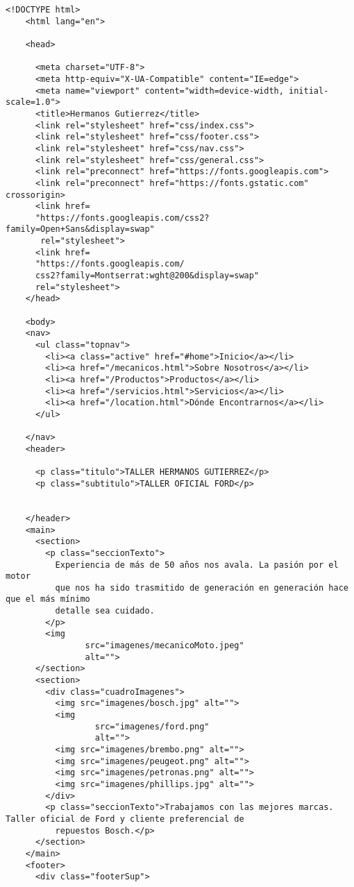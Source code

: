 \begin{lstlisting}[caption=index.html (LMSI)]
    <!DOCTYPE html>
    <html lang="en">
    
    <head>
    
      <meta charset="UTF-8">
      <meta http-equiv="X-UA-Compatible" content="IE=edge">
      <meta name="viewport" content="width=device-width, initial-scale=1.0">
      <title>Hermanos Gutierrez</title>
      <link rel="stylesheet" href="css/index.css">
      <link rel="stylesheet" href="css/footer.css">
      <link rel="stylesheet" href="css/nav.css">
      <link rel="stylesheet" href="css/general.css">
      <link rel="preconnect" href="https://fonts.googleapis.com">
      <link rel="preconnect" href="https://fonts.gstatic.com" crossorigin>
      <link href=
      "https://fonts.googleapis.com/css2?family=Open+Sans&display=swap"
       rel="stylesheet">
      <link href=
      "https://fonts.googleapis.com/
      css2?family=Montserrat:wght@200&display=swap" 
      rel="stylesheet">
    </head>
    
    <body>
    <nav>
      <ul class="topnav">
        <li><a class="active" href="#home">Inicio</a></li>
        <li><a href="/mecanicos.html">Sobre Nosotros</a></li>
        <li><a href="/Productos">Productos</a></li>
        <li><a href="/servicios.html">Servicios</a></li>
        <li><a href="/location.html">Dónde Encontrarnos</a></li>
      </ul>
    
    </nav>
    <header>
    
      <p class="titulo">TALLER HERMANOS GUTIERREZ</p>
      <p class="subtitulo">TALLER OFICIAL FORD</p>
    
    
    </header>
    <main>
      <section>
        <p class="seccionTexto">
          Experiencia de más de 50 años nos avala. La pasión por el motor
          que nos ha sido trasmitido de generación en generación hace que el más mínimo
          detalle sea cuidado.
        </p>
        <img
                src="imagenes/mecanicoMoto.jpeg"
                alt="">
      </section>
      <section>
        <div class="cuadroImagenes">
          <img src="imagenes/bosch.jpg" alt="">
          <img
                  src="imagenes/ford.png"
                  alt="">
          <img src="imagenes/brembo.png" alt="">
          <img src="imagenes/peugeot.png" alt="">
          <img src="imagenes/petronas.png" alt="">
          <img src="imagenes/phillips.jpg" alt="">
        </div>
        <p class="seccionTexto">Trabajamos con las mejores marcas. Taller oficial de Ford y cliente preferencial de
          repuestos Bosch.</p>
      </section>
    </main>
    <footer>
      <div class="footerSup">
    

\end{lstlisting}
